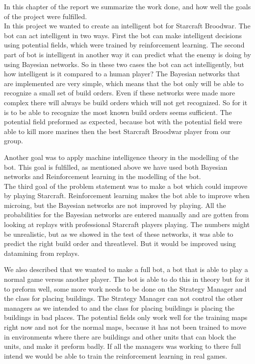 In this chapter of the report we summarize the work done, and how well the goals of the project were fulfilled. \\

In this project we wanted to create an intelligent bot for Starcraft Broodwar. The bot can act intelligent in two ways. First the bot can make intelligent decisions using potential fields, which were trained by reinforcement learning. The second part of bot is intelligent in another way  it can predict what the enemy is doing by using Bayesian networks. 
So in these two cases the bot can act intelligently, but how intelligent is it compared to a human player? The Bayesian networks that are implemented are very simple, which means that the bot only will be able to recognize a small set of build orders. Even if these networks were made more complex there will always be build orders which will not get recognized. So for it is to be able to recognize the most known build orders seems sufficient. The potential field preformed as expected, because bot with the potential field were able to kill more marines then the best Starcraft Broodwar player from our group.

Another goal was to apply machine intelligence theory in the modelling of the bot. This goal is fulfilled, as mentioned above we have used both 
Bayesian networks and Reinforcement learning in the modelling of the bot.\\

The third goal of the problem statement was to make a bot which could improve by playing Starcraft. 
Reinforcement learning makes the bot able to improve when microing, but the Bayesian networks are not improved by playing. All the probabilities for the Bayesian networks are entered manually and are gotten from looking at replays with professional Starcraft players playing. The numbers might be unrealistic, but as we showed in the test of these networks, it was able to predict the right build order and threatlevel. But it would be improved using datamining from replays.

We also described that we wanted to make a full bot, a bot that is able to play a normal game versus another player. The bot is able to do this in theory but for it to preform well, some more work needs to be done on the Strategy Manager and the class for placing buildings. The Strategy Manager can not control the other managers as we intended to and the class for placing buildings is placing the buildings in bad places. The potential fields only work well for the training maps right now and not for the normal maps, because it has not been trained to move in environments where there are buildings and other units that can block the units, and make it preform badly. If all the managers was working to there full intend we would be able to train the reinforcement learning in real games.

